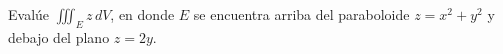 \item Evalúe $\iiint_E z \, dV$, en donde $E$ se encuentra arriba del paraboloide $z = x^2 + y^2$ y debajo del plano $z = 2y$.
